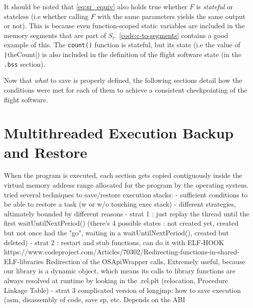 {It should be noted that \autoref{eq:sr_equiv} also holds true whether $F$ is \textit{stateful} or stateless (i.e whether calling $F$ with the same parameters yields the same output or not). This is because even function-scoped static variables are included in the memory segments that are part of $S_r$. \autoref{code:c-to-segments} contains a good example of this. The \texttt{count()} function is stateful, but its state (i.e the value of \texttt|theCount|) is also included in the definition of the flight software state (in the \texttt{.bss} section).

Now that \textit{what} to save is properly defined, the following sections detail how the conditions were met for each of them to achieve a consistent checkpointing of the flight software.




\section{Multithreaded Execution Backup and Restore}\label{sec:das-exec-restore}
When the program is executed, each section gets copied contiguously inside the virtual memory address range allocated for the program by the operating system. 
tried several techniques to save/restore execution stacks:
- sufficient conditions to be able to restore a task (w or w/o touching exec stack)
- different strategies, ultimately bounded by different reasons 
- strat 1 : just replay the thread until the first waitUntilNextPeriod() (there's 4 possible states : not created yet, created but not once had the "go", waiting in a waitUntilNextPeriod(), created but deleted)
- strat 2 : restart and stub functions, can do it with ELF-HOOK https://www.codeproject.com/Articles/70302/Redirecting-functions-in-shared-ELF-libraries
Redirection of the OSApiWrapper calls, Extremely useful, because our library is a dynamic object, which means its calls to library functions are always resolved at runtime by looking in the .rel.plt (relocation, Procedure Linkage Table)
- strat 3 complicated version of longjmp: how to save execution (asm, disassembly of code, save sp, etc.%
Depends on the ABI

}